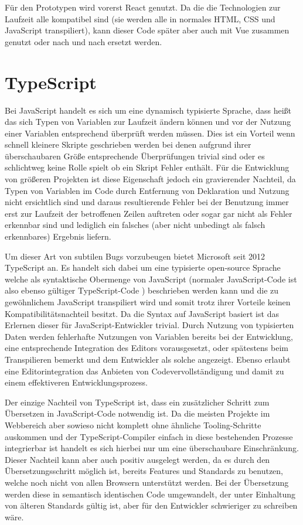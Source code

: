 Für den Prototypen wird vorerst React genutzt. Da die die Technologien zur Laufzeit alle kompatibel sind (sie werden alle in normales HTML, CSS und JavaScript transpiliert), kann dieser Code später aber auch mit Vue zusammen genutzt oder nach und nach ersetzt werden.

\section{TypeScript}
Bei JavaScript handelt es sich um eine dynamisch typisierte Sprache, dass heißt das sich Typen von Variablen zur Laufzeit ändern können und vor der Nutzung einer Variablen entsprechend überprüft werden müssen. Dies ist ein Vorteil wenn schnell kleinere Skripte geschrieben werden bei denen aufgrund ihrer überschaubaren Größe entsprechende Überprüfungen trivial sind oder es schlichtweg keine Rolle spielt ob ein Skript Fehler enthält. Für die Entwicklung von größeren Projekten ist diese Eigenschaft jedoch ein gravierender Nachteil, da Typen von Variablen im Code durch Entfernung von Deklaration und Nutzung nicht ersichtlich sind und daraus resultierende Fehler bei der Benutzung immer erst zur Laufzeit der betroffenen Zeilen auftreten oder sogar gar nicht als Fehler erkennbar sind und lediglich ein falsches (aber nicht unbedingt als falsch erkennbares) Ergebnis liefern.   

Um dieser Art von subtilen Bugs vorzubeugen bietet Microsoft seit 2012 TypeScript an. Es handelt sich dabei um eine typisierte open-source Sprache welche als syntaktische Obermenge von JavaScript (normaler JavaScript-Code ist also ebenso gültiger TypeScript-Code ) beschrieben werden kann und die zu gewöhnlichem JavaScript transpiliert  wird und somit trotz ihrer Vorteile keinen Kompatibilitätsnachteil besitzt. Da die Syntax auf JavaScript basiert ist das Erlernen dieser für JavaScript-Entwickler trivial. Durch Nutzung von typisierten Daten werden fehlerhafte Nutzungen von Variablen bereits bei der Entwicklung, eine entsprechende Integration des Editors vorausgesetzt, oder spätestens beim Transpilieren bemerkt und dem Entwickler als solche angezeigt. Ebenso erlaubt eine Editorintegration das Anbieten von Codevervollständigung und damit zu einem effektiveren Entwicklungsprozess.

Der einzige Nachteil von TypeScript ist, dass ein zusätzlicher Schritt zum Übersetzen in JavaScript-Code notwendig ist. Da die meisten Projekte im Webbereich aber sowieso nicht komplett ohne ähnliche Tooling-Schritte auskommen und der TypeScript-Compiler einfach in diese bestehenden Prozesse integrierbar ist handelt es sich hierbei nur um eine überschaubare Einschränkung. Dieser Nachteil kann aber auch positiv ausgelegt werden, da es durch den Übersetzungsschritt möglich ist, bereits Features und Standards zu benutzen, welche noch nicht von allen Browsern unterstützt werden. Bei der Übersetzung werden diese in semantisch identischen Code umgewandelt, der unter Einhaltung von älteren Standards gültig ist, aber für den Entwickler schwieriger zu schreiben wäre. 

